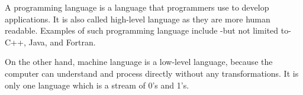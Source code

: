 
A programming language is a language that programmers use to develop applications. It is also called high-level language as they are more human readable. Examples of such programming language include -but not limited to- C++, Java, and Fortran.

On the other hand, machine language is a low-level language, because the computer can understand and process directly without any transformations. It is only one language which is a stream of 0's and 1's.

